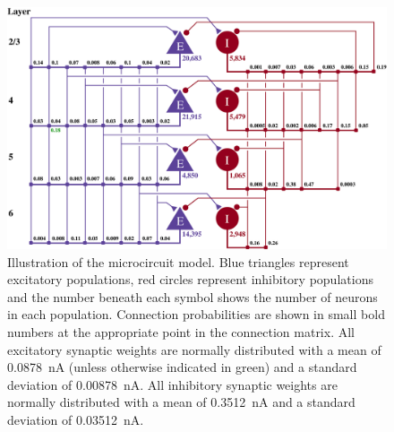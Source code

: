 \documentclass[utf8]{frontiersSCNS} %
\begin{document}
\begin{figure}[t!]
    \begin{center}
        \includegraphics[width=180mm]{figures/potjans_circuit_v2}
    \end{center}
    \caption{Illustration of the microcircuit model.
    Blue triangles represent excitatory populations, red circles represent inhibitory populations and the number beneath each symbol shows the number of neurons in each population.
    Connection probabilities are shown in small bold numbers at the appropriate point in the connection matrix.
    All excitatory synaptic weights are normally distributed with a mean of \SI{0.0878}{\nano\ampere} (unless otherwise indicated in green) and a standard deviation of \SI{0.00878}{\nano\ampere}.
    All inhibitory synaptic weights are normally distributed with a mean of \SI{0.3512}{\nano\ampere} and a standard deviation of \SI{0.03512}{\nano\ampere}.}
    \label{fig:potjans_circuit}
\end{figure}
%
\end{document}

